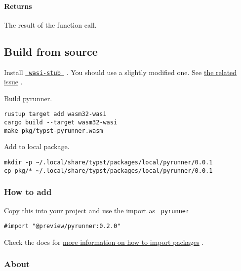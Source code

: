 \paragraph{Returns}\label{returns-2}

The result of the function call.

\subsection{Build from source}\label{build-from-source}

Install
\href{https://github.com/astrale-sharp/wasm-minimal-protocol}{\texttt{\ wasi-stub\ }}
. You should use a slightly modified one. See
\href{https://github.com/astrale-sharp/wasm-minimal-protocol/issues/22\#issuecomment-1827379467}{the
related issue} .

Build pyrunner.

\begin{verbatim}
rustup target add wasm32-wasi
cargo build --target wasm32-wasi
make pkg/typst-pyrunner.wasm
\end{verbatim}

Add to local package.

\begin{verbatim}
mkdir -p ~/.local/share/typst/packages/local/pyrunner/0.0.1
cp pkg/* ~/.local/share/typst/packages/local/pyrunner/0.0.1
\end{verbatim}

\subsubsection{How to add}\label{how-to-add}

Copy this into your project and use the import as \texttt{\ pyrunner\ }

\begin{verbatim}
#import "@preview/pyrunner:0.2.0"
\end{verbatim}



Check the docs for
\href{https://typst.app/docs/reference/scripting/\#packages}{more
information on how to import packages} .

\subsubsection{About}\label{about}

